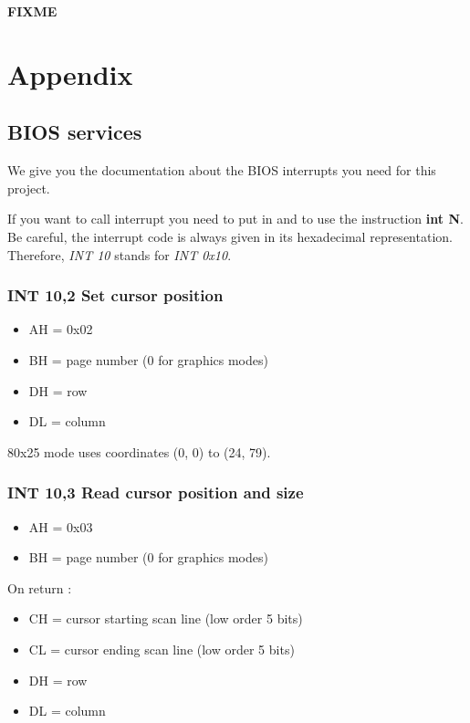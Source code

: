 \textbf{FIXME}


%
%

\chapter{Appendix}

%
%

\section{BIOS services}

We give you the documentation about the BIOS interrupts you need for this
project.

If you want to call interrupt  you need to put  in
 and to use the instruction \textbf{int N}. Be careful, the
interrupt code is always given in its hexadecimal representation. Therefore,
\emph{INT 10} stands for \emph{INT 0x10}.

%
%
\subsection{INT 10,2 Set cursor position}
\begin{itemize}
  \item{AH = 0x02}
  \item{BH = page number (0 for graphics modes)}
  \item{DH = row}
  \item{DL = column}
\end{itemize}

80x25 mode uses coordinates (0, 0) to (24, 79).

\subsection{INT 10,3 Read cursor position and size}
\begin{itemize}
  \item{AH = 0x03}
  \item{BH = page number (0 for graphics modes)}
\end{itemize}

On return :

\begin{itemize}
  \item{CH = cursor starting scan line (low order 5 bits)}
  \item{CL = cursor ending scan line (low order 5 bits)}
  \item{DH = row}
  \item{DL = column}
\end{itemize}


